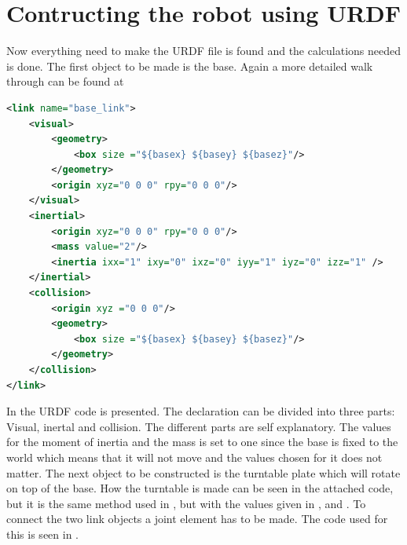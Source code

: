 \section{Contructing the robot using URDF}\label{sec:makingurdf}
Now everything need to make the URDF file is found and the calculations needed is done. The first object to be made is the base. Again a more detailed walk through can be found at \cite{ROSWiki,GazeboURDF}\\
\begin{lstlisting}[language=xml,caption={Base},label={lst:base}]
<link name="base_link">
    <visual>
        <geometry>
            <box size ="${basex} ${basey} ${basez}"/>
        </geometry>
        <origin xyz="0 0 0" rpy="0 0 0"/>
    </visual>
    <inertial>
        <origin xyz="0 0 0" rpy="0 0 0"/>
        <mass value="2"/>
        <inertia ixx="1" ixy="0" ixz="0" iyy="1" iyz="0" izz="1" />
    </inertial>
    <collision>
        <origin xyz ="0 0 0"/>
        <geometry>
            <box size ="${basex} ${basey} ${basez}"/>
        </geometry>
    </collision>
</link>
\end{lstlisting}
In  the URDF code is presented. The declaration can be divided into three parts: Visual, inertal and collision. The different parts are self explanatory. The values for the moment of inertia and the mass is set to one since the base is fixed to the world which means that it will not move and the values chosen for it does not matter. The next object to be constructed is the turntable plate which will rotate on top of the base. How the turntable is made can be seen in the attached code, but it is the same method used in , but with the values given in ,  and . To connect the two link objects a joint element has to be made. The code used for this is seen in .


